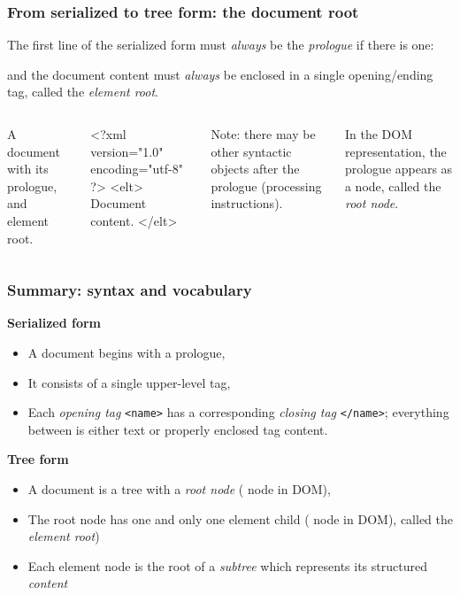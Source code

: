 \begin{frame}[fragile]
\frametitle{From serialized to tree form: the document root}

The first line of the serialized form must \emph{always} be the
\emph{prologue} if there is one:


and the document content must \emph{always} be enclosed in
a single opening/ending tag, called the \emph{element root}.

\vspace*{-1em}
\begin{columns}

A document with its prologue, and element
root.

\begin{tinyverbatim}
<?xml version="1.0"  
    encoding="utf-8" ?>
<elt>
  Document content.
</elt>
\end{tinyverbatim}

Note: there may be other syntactic 
objects after the prologue (processing instructions).


 In the DOM representation, the prologue appears as
  a  node, called the \emph{root node}.

   

\end{columns}

\end{frame}

\begin{frame}
\frametitle{Summary: syntax and vocabulary}


\textbf{Serialized form}
\begin{itemize}
  \item A document begins with a prologue,
  \item It consists of a single upper-level tag, 
  \item Each \emph{opening tag} \texttt{<name>}
      has a corresponding \emph{closing tag} \texttt{</name>};
      everything between is either text or properly enclosed
         tag content.
\end{itemize}

\textbf{Tree form}
\begin{itemize}
  \item A document is a tree with a \emph{root node} (
          node in DOM),
  \item The root node has one and only one element child
              ( node in DOM), called the 
             \emph{element root})
  \item Each element node is the root of a \emph{subtree}
            which represents its structured \emph{content}
\end{itemize}

\end{frame}

